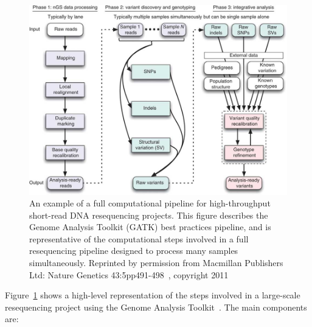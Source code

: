 \begin{figure}
\centering
\includegraphics[width=1\textwidth]{figures/ng-806-F1.jpg}
\caption[An example of a computational pipeline for high-throughput short-read DNA resequencing projects.]{An example of a full computational pipeline for high-throughput short-read DNA resequencing projects. This figure describes the Genome Analysis Toolkit (GATK) best practices pipeline, and is representative of the computational steps involved in a full resequencing pipeline designed to process many samples simultaneously. Reprinted by permission from Macmillan Publishers Ltd: Nature Genetics 43:5pp491-498~\cite{DePristo:2011fo}, copyright 2011}
\label{gatk_pipeline}
\end{figure}

Figure~\ref{gatk_pipeline} shows a high-level representation of the steps involved in a large-scale resequencing project using the Genome Analysis Toolkit~\cite{DePristo:2011fo}. The main components are:

